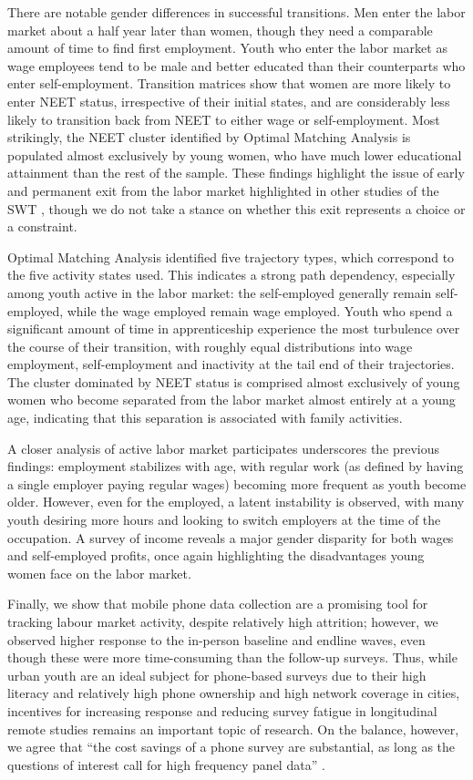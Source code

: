 \documentclass[
  a4paper, twoside, 12pt]{book}
\begin{document}
There are notable gender differences in successful transitions. Men enter the labor market about a half year later than women, though they need a comparable amount of time to find first employment. Youth who enter the labor market as wage employees tend to be male and better educated than their counterparts who enter self-employment. Transition matrices show that women are more likely to enter NEET status, irrespective of their initial states, and are considerably less likely to transition back from NEET to either wage or self-employment. Most strikingly, the NEET cluster identified by Optimal Matching Analysis is populated almost exclusively by young women, who have much lower educational attainment than the rest of the sample. These findings highlight the issue of early and permanent exit from the labor market highlighted in other studies of the SWT \autocite{manacorda2017,dedehouanou2019}, though we do not take a stance on whether this exit represents a choice or a constraint.

Optimal Matching Analysis identified five trajectory types, which correspond to the five activity states used. This indicates a strong path dependency, especially among youth active in the labor market: the self-employed generally remain self-employed, while the wage employed remain wage employed. Youth who spend a significant amount of time in apprenticeship experience the most turbulence over the course of their transition, with roughly equal distributions into wage employment, self-employment and inactivity at the tail end of their trajectories. The cluster dominated by NEET status is comprised almost exclusively of young women who become separated from the labor market almost entirely at a young age, indicating that this separation is associated with family activities.

A closer analysis of active labor market participates underscores the previous findings: employment stabilizes with age, with regular work (as defined by having a single employer paying regular wages) becoming more frequent as youth become older. However, even for the employed, a latent instability is observed, with many youth desiring more hours and looking to switch employers at the time of the occupation. A survey of income reveals a major gender disparity for both wages and self-employed profits, once again highlighting the disadvantages young women face on the labor market.

Finally, we show that mobile phone data collection are a promising tool for tracking labour market activity, despite relatively high attrition; however, we observed higher response to the in-person baseline and endline waves, even though these were more time-consuming than the follow-up surveys. Thus, while urban youth are an ideal subject for phone-based surveys due to their high literacy and relatively high phone ownership and high network coverage in cities, incentives for increasing response and reducing survey fatigue in longitudinal remote studies remains an important topic of research. On the balance, however, we agree that ``the cost savings of a phone survey are substantial, as long as the questions of interest call for high frequency panel data'' \autocite{dillon2012}.
\end{document}
